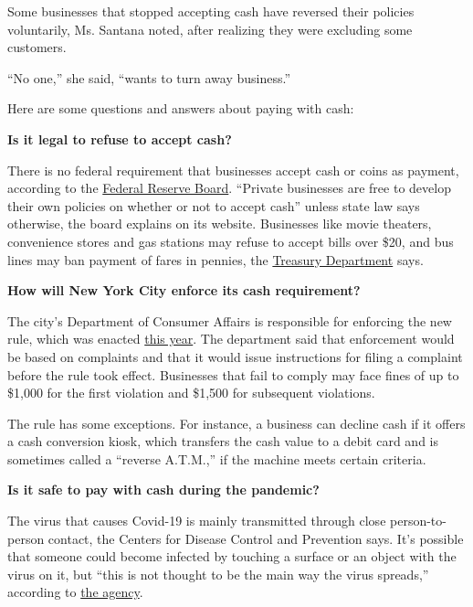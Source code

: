 Some businesses that stopped accepting cash have reversed their policies
voluntarily, Ms. Santana noted, after realizing they were excluding some
customers.

``No one,'' she said, ``wants to turn away business.''

Here are some questions and answers about paying with cash:

\textbf{Is it legal to refuse to accept cash?}

There is no federal requirement that businesses accept cash or coins as
payment, according to the
\href{https://www.federalreserve.gov/faqs/currency_12772.htm}{Federal
Reserve Board}. ``Private businesses are free to develop their own
policies on whether or not to accept cash'' unless state law says
otherwise, the board explains on its website. Businesses like movie
theaters, convenience stores and gas stations may refuse to accept bills
over \$20, and bus lines may ban payment of fares in pennies, the
\href{https://www.treasury.gov/resource-center/faqs/currency/pages/legal-tender.aspx}{Treasury
Department} says.

\textbf{How will New York City enforce its cash requirement?}

The city's Department of Consumer Affairs is responsible for enforcing
the new rule, which was enacted
\href{https://legistar.council.nyc.gov/LegislationDetail.aspx?ID=3763665\&GUID=7800AFC9-D8B1-41FD-9C31-172565712686\&Options=ID\%7CText\%7C\&Search=cashless}{this
year}. The department said that enforcement would be based on complaints
and that it would issue instructions for filing a complaint before the
rule took effect. Businesses that fail to comply may face fines of up to
\$1,000 for the first violation and \$1,500 for subsequent violations.

The rule has some exceptions. For instance, a business can decline cash
if it offers a cash conversion kiosk, which transfers the cash value to
a debit card and is sometimes called a ``reverse A.T.M.,'' if the
machine meets certain criteria.

\textbf{Is it safe to pay with cash during the pandemic?}

The virus that causes Covid-19 is mainly transmitted through close
person-to-person contact, the Centers for Disease Control and Prevention
says. It's possible that someone could become infected by touching a
surface or an object with the virus on it, but ``this is not thought to
be the main way the virus spreads,'' according to
\href{https://www.cdc.gov/coronavirus/2019-ncov/prevent-getting-sick/how-covid-spreads.html}{the
agency}.

